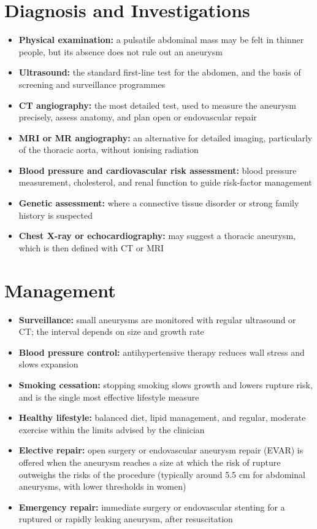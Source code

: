 \section*{Diagnosis and Investigations}
\begin{itemize}
    \item \textbf{Physical examination:} a pulsatile abdominal mass may be felt in thinner people, but its absence does not rule out an aneurysm
    \item \textbf{Ultrasound:} the standard first-line test for the abdomen, and the basis of screening and surveillance programmes
    \item \textbf{CT angiography:} the most detailed test, used to measure the aneurysm precisely, assess anatomy, and plan open or endovascular repair
    \item \textbf{MRI or MR angiography:} an alternative for detailed imaging, particularly of the thoracic aorta, without ionising radiation
    \item \textbf{Blood pressure and cardiovascular risk assessment:} blood pressure measurement, cholesterol, and renal function to guide risk-factor management
    \item \textbf{Genetic assessment:} where a connective tissue disorder or strong family history is suspected
    \item \textbf{Chest X-ray or echocardiography:} may suggest a thoracic aneurysm, which is then defined with CT or MRI
\end{itemize}

\section*{Management}
\begin{itemize}
    \item \textbf{Surveillance:} small aneurysms are monitored with regular ultrasound or CT; the interval depends on size and growth rate
    \item \textbf{Blood pressure control:} antihypertensive therapy reduces wall stress and slows expansion
    \item \textbf{Smoking cessation:} stopping smoking slows growth and lowers rupture risk, and is the single most effective lifestyle measure
    \item \textbf{Healthy lifestyle:} balanced diet, lipid management, and regular, moderate exercise within the limits advised by the clinician
    \item \textbf{Elective repair:} open surgery or endovascular aneurysm repair (EVAR) is offered when the aneurysm reaches a size at which the risk of rupture outweighs the risks of the procedure (typically around 5.5 cm for abdominal aneurysms, with lower thresholds in women)
    \item \textbf{Emergency repair:} immediate surgery or endovascular stenting for a ruptured or rapidly leaking aneurysm, after resuscitation
\end{itemize}

